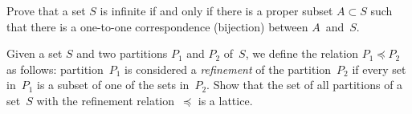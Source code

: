 \documentclass[a4paper,12pt]{article}
\begin{document}
\begin{tasks}
    \item Prove that a set $S$ is infinite if and only if there is a proper subset $A \subset S$ such that there is a one-to-one correspondence (bijection) between $A$~and~$S$.


    \item Given a set $S$ and two partitions $P_1$ and $P_2$ of~$S$, we define the relation $P_1 \preceq P_2$ as follows: partition~$P_1$ is considered a \textit{refinement} of the partition~$P_2$ if every set in~$P_1$ is a subset of one of the sets in~$P_2$.
    Show that the set of all partitions of a set~$S$ with the refinement relation~$\preceq$ is a lattice.


\end{tasks}
\end{document}
